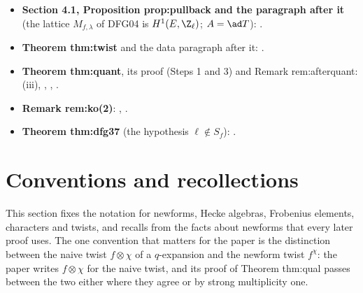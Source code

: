 \begin{itemize}
.
\item \textbf{Section 4.1, Proposition prop:pullback and the paragraph after it} (the lattice $M_{f,\lambda}$ of DFG04 is $H^1(E,\Z_\ell)$; $A=\ad T$): .
\item \textbf{Theorem thm:twist} and the data paragraph after it: .
\item \textbf{Theorem thm:quant}, its proof (Steps 1 and 3) and Remark rem:afterquant: (iii), ,
, .
\item \textbf{Remark rem:ko(2)}: , .
\item \textbf{Theorem thm:dfg37} (the hypothesis $\ell\notin S_f$): .
\end{itemize}

\section{Conventions and recollections}\label{sec:modgalrep:conventions}

This section fixes the notation for newforms, Hecke algebras, Frobenius elements, characters and twists, and recalls from
 the facts about newforms that every later proof uses. The one convention that matters for the paper is the distinction
between the naive twist $f\otimes\chi$ of a $q$-expansion and the newform twist $f^\chi$: the paper writes $f\otimes\chi$ for the naive twist, and its proof of
Theorem thm:qual passes between the two either where they agree or by strong multiplicity one.

